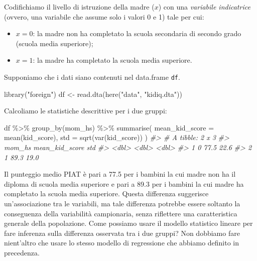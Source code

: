 \documentclass[
  10pt,
  italian,
  a4paper,
  extrafontsizes,onecolumn,openright
  ]{memoir}
\newenvironment{Shaded}{\begin{snugshade}}{\end{snugshade}}
\newcommand{\AttributeTok}[1]{\textcolor[rgb]{0.77,0.63,0.00}{#1}}
\newcommand{\CommentTok}[1]{\textcolor[rgb]{0.56,0.35,0.01}{\textit{#1}}}
\newcommand{\FunctionTok}[1]{\textcolor[rgb]{0.00,0.00,0.00}{#1}}
\newcommand{\NormalTok}[1]{#1}
\newcommand{\OtherTok}[1]{\textcolor[rgb]{0.56,0.35,0.01}{#1}}
\newcommand{\SpecialCharTok}[1]{\textcolor[rgb]{0.00,0.00,0.00}{#1}}
\newcommand{\StringTok}[1]{\textcolor[rgb]{0.31,0.60,0.02}{#1}}
\begin{document}
Codifichiamo il livello di istruzione della madre (\(x\)) con una \emph{variabile indicatrice} (ovvero, una variabile che assume solo i valori 0 e 1) tale per cui:

\begin{itemize}
\item
  \(x=0\): la madre non ha completato la scuola secondaria di secondo grado (scuola media superiore);
\item
  \(x=1\): la madre ha completato la scuola media superiore.
\end{itemize}

\noindent
Supponiamo che i dati siano contenuti nel data.frame \texttt{df}.

\begin{Shaded}
\begin{Highlighting}[]
\FunctionTok{library}\NormalTok{(}\StringTok{"foreign"}\NormalTok{)}
\NormalTok{df }\OtherTok{\textless{}{-}} \FunctionTok{read.dta}\NormalTok{(}\FunctionTok{here}\NormalTok{(}\StringTok{"data"}\NormalTok{, }\StringTok{"kidiq.dta"}\NormalTok{))}
\end{Highlighting}
\end{Shaded}

\noindent
Calcoliamo le statistiche descrittive per i due gruppi:

\begin{Shaded}
\begin{Highlighting}[]
\NormalTok{df }\SpecialCharTok{\%\textgreater{}\%} 
  \FunctionTok{group\_by}\NormalTok{(mom\_hs) }\SpecialCharTok{\%\textgreater{}\%} 
  \FunctionTok{summarise}\NormalTok{(}
    \AttributeTok{mean\_kid\_score =} \FunctionTok{mean}\NormalTok{(kid\_score),}
    \AttributeTok{std =} \FunctionTok{sqrt}\NormalTok{(}\FunctionTok{var}\NormalTok{(kid\_score))}
\NormalTok{  )}
\CommentTok{\#\textgreater{} \# A tibble: 2 x 3}
\CommentTok{\#\textgreater{}   mom\_hs mean\_kid\_score   std}
\CommentTok{\#\textgreater{}    \textless{}dbl\textgreater{}          \textless{}dbl\textgreater{} \textless{}dbl\textgreater{}}
\CommentTok{\#\textgreater{} 1      0           77.5  22.6}
\CommentTok{\#\textgreater{} 2      1           89.3  19.0}
\end{Highlighting}
\end{Shaded}

\noindent
Il punteggio medio PIAT è pari a 77.5 per i bambini la cui madre non ha il diploma di scuola media superiore e pari a 89.3 per i bambini la cui madre ha completato la scuola media superiore. Questa differenza suggerisce un'associazione tra le variabili, ma tale differenza potrebbe essere soltanto la conseguenza della variabilità campionaria, senza riflettere una caratteristica generale della popolazione. Come possiamo usare il modello statistico lineare per fare inferenza sulla differenza osservata tra i due gruppi? Non dobbiamo fare nient'altro che usare lo stesso modello di regressione che abbiamo definito in precedenza.
\end{document}
